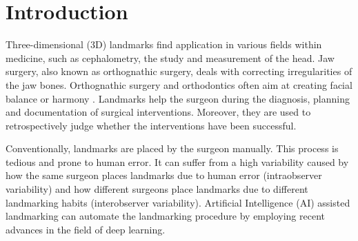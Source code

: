 
% 

 
 




\section{Introduction}
\label{sec:introduction}
Three-dimensional (3D) landmarks find application in various fields within medicine, such as cephalometry, the study and measurement of the head. Jaw surgery, also known as orthognathic surgery, deals with correcting irregularities of the jaw bones. Orthognathic surgery and orthodontics often aim at creating facial balance or harmony \cite{Plooij2009}. Landmarks help the surgeon during the diagnosis, planning and documentation of surgical interventions. Moreover, they are used to retrospectively judge whether the interventions have been successful. %

Conventionally, landmarks are placed by the surgeon %
manually. This process is tedious and prone to human error. It can suffer from a high variability caused by how the same surgeon places landmarks due to human error (intraobserver variability) and how different surgeons place landmarks due to different landmarking habits (interobserver variability).
Artificial Intelligence (AI) assisted landmarking can automate the landmarking procedure by employing recent advances in the field of deep learning.

